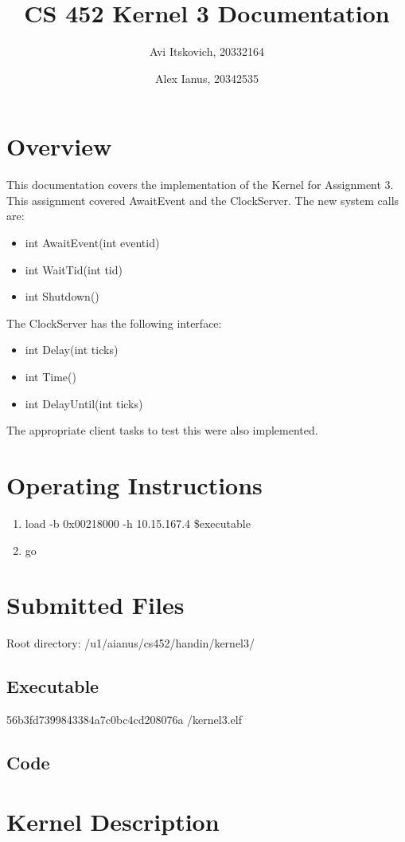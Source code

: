 \documentclass{article}
\title{CS 452 Kernel 3 Documentation}
\author{
  Avi Itskovich, 20332164
  \and
  Alex Ianus, 20342535
}
\begin{document}
\maketitle

\section{Overview}

This documentation covers the implementation of the Kernel for Assignment 3. This assignment covered AwaitEvent and the ClockServer. The new system calls are: 
\begin{itemize}
  \item int AwaitEvent(int eventid)
  \item int WaitTid(int tid)
  \item int Shutdown()
\end{itemize}
The ClockServer has the following interface:
\begin{itemize}
  \item int Delay(int ticks)
  \item int Time()
  \item int DelayUntil(int ticks)
\end{itemize}
The appropriate client tasks to test this were also implemented.

\section{Operating Instructions}
\begin{enumerate}
  \item load -b 0x00218000 -h 10.15.167.4 \$executable
  \item go
\end{enumerate}

\section{Submitted Files}
Root directory: /u1/aianus/cs452/handin/kernel3/

\subsection{Executable}
56b3fd7399843384a7c0bc4cd208076a  /kernel3.elf
\subsection{Code}

\section{Kernel Description}
\end{document}
